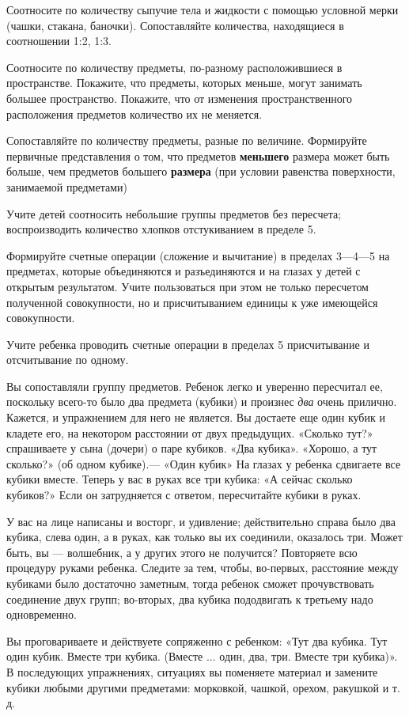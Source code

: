 \documentclass{book}
\renewcommand{\emph}[1]{\textit{#1}}
\begin{document}
Соотносите по количеству сыпучие тела и жидкости с помощью условной
мерки (чашки, стакана, баночки). Сопоставляйте количества, находящиеся в
соотношении 1:2, 1:3.

Соотносите по количеству предметы, по-разному расположившиеся в
пространстве. Покажите, что предметы, которых меньше, могут занимать
большее пространство. Покажите, что от изменения пространственного
расположения предметов количество их не меняется.

Сопоставляйте по количеству предметы, разные по величине. Формируйте
первичные представления о том, что предметов \textbf{меньшего} размера
может быть больше, чем предметов большего \textbf{размера} (при условии
равенства поверхности, занимаемой предметами)

Учите детей соотносить небольшие группы предметов без пересчета;
воспроизводить количество хлопков отстукиванием в пределе 5.

Формируйте счетные операции (сложение и вычитание) в пределах 3---4---5
на предметах, которые объединяются и разъединяются и на глазах у детей с
открытым результатом. Учите пользоваться при этом не только пересчетом
полученной совокупности, но и присчитыванием единицы к уже имеющейся
совокупности.

Учите ребенка проводить счетные операции в пределах 5 присчитывание и
отсчитывание по одному.

Вы сопоставляли группу предметов. Ребенок легко и уверенно пересчитал
ее, поскольку всего-то было два предмета (кубики) и произнес \emph{два}
очень прилично. Кажется, и упражнением для него не является. Вы достаете
еще один кубик и кладете его, на некотором расстоянии от двух
предыдущих. «Сколько тут?» спрашиваете у сына (дочери) о паре кубиков.
«Два кубика». «Хорошо, а тут сколько?» (об одном кубике).--- «Один
кубик» На глазах у ребенка сдвигаете все кубики вместе. Теперь у вас в
руках все три кубика: «А сейчас сколько кубиков?» Если он затрудняется с
ответом, пересчитайте кубики в руках.

У вас на лице написаны и восторг, и удивление; действительно справа было
два кубика, слева один, а в руках, как только вы их соединили, оказалось
три. Может быть, вы --- волшебник, а у других этого не получится?
Повторяете всю процедуру руками ребенка. Следите за тем, чтобы,
во-первых, расстояние между кубиками было достаточно заметным, тогда
ребенок сможет прочувствовать соединение двух групп; во-вторых, два
кубика пододвигать к третьему надо одновременно.

Вы проговариваете и действуете сопряженно с ребенком: «Тут два кубика.
Тут один кубик. Вместе три кубика. (Вместе ... один, два, три. Вместе
три кубика)». В последующих упражнениях, ситуациях вы поменяете материал
и замените кубики любыми другими предметами: морковкой, чашкой, орехом,
ракушкой и т. д.
\end{document}
